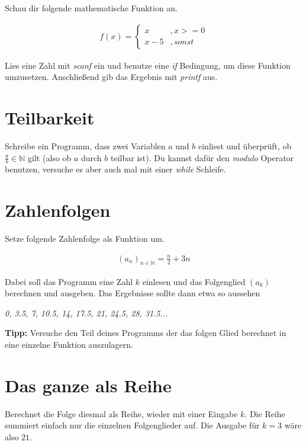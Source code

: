 \documentclass[c_worksheet.tex]{subfiles}
\begin{document}
Schau dir folgende mathematische Funktion an.

\begin{align*}
	f(x) = \begin{cases}
		x &, x >= 0 \\
		x-5 &, sonst
	\end{cases}
\end{align*}

Lies eine Zahl mit \emph{scanf} ein und benutze eine \emph{if} Bedingung, um diese Funktion umzusetzen. Anschließend gib das Ergebnis mit \emph{printf} aus.


\section{Teilbarkeit}

Schreibe ein Programm, dass zwei Variablen \(a\) und \(b\) einliest und überprüft, ob \( \frac{a}{b} \in \mathbb{N} \) gilt (also ob \(a\) durch \(b\) teilbar ist). Du kannst dafür den \emph{modulo} Operator benutzen, versuche es aber auch mal mit einer \emph{while} Schleife.


\section{Zahlenfolgen}

Setze folgende Zahlenfolge als Funktion um.

\begin{align*}
 	(a_n)_{n \in \mathbb{N} } = \frac{n}{2} + 3n 
 \end{align*} 

 Dabei soll das Programm eine Zahl \(k\) einlesen und das Folgenglied \( (a_k) \) berechnen und ausgeben. Das Ergebnisse sollte dann etwa so aussehen

\begin{center}
\textit{0, 3.5, 7, 10.5, 14, 17.5, 21, 24.5, 28, 31.5... } 
\end{center}

\textbf{Tipp:} Versuche den Teil deines Programms der das folgen Glied berechnet in eine einzelne Funktion auszulagern.


\section{Das ganze als Reihe}

Berechnet die Folge diesmal als Reihe, wieder mit einer Eingabe \(k\). Die Reihe summiert einfach nur die einzelnen Folgenglieder auf. Die Ausgabe für \(k = 3\) wäre also \( 21 \).
\end{document}
